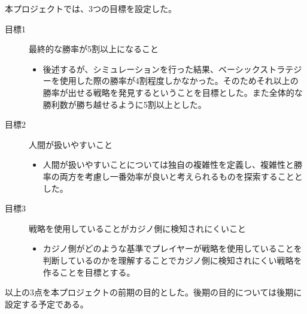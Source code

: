 本プロジェクトでは、3つの目標を設定した。
\begin{description}
\item[目標1] 最終的な勝率が5割以上になること
\begin{itemize}
\item{後述するが、シミュレーションを行った結果、ベーシックストラテジーを使用した際の勝率が4割程度しかなかった。そのためそれ以上の勝率が出せる戦略を発見するということを目標とした。また全体的な勝利数が勝ち越せるように5割以上とした。}
\end{itemize}
\item[目標2]人間が扱いやすいこと
\begin{itemize}
\item{人間が扱いやすいことについては独自の複雑性を定義し、複雑性と勝率の両方を考慮し一番効率が良いと考えられるものを探索することとした。}
\end{itemize}
\item[目標3]戦略を使用していることがカジノ側に検知されにくいこと
\begin{itemize}
\item{カジノ側がどのような基準でプレイヤーが戦略を使用していることを判断しているのかを理解することでカジノ側に検知されにくい戦略を作ることを目標とする。}
\end{itemize}
\end{description}
以上の3点を本プロジェクトの前期の目的とした。後期の目的については後期に設定する予定である。
